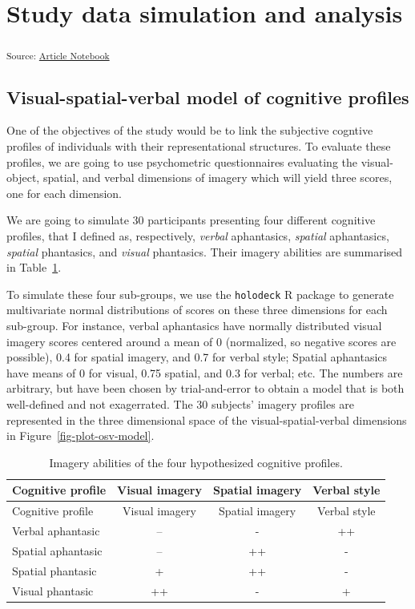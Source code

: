 \documentclass[
  authoryear]{elsarticle}
\begin{document}
\section{Study data simulation and
analysis}\label{study-data-simulation-and-analysis}

\textsubscript{Source:
\href{https://m-delem.github.io/2499-similarity-manuscript/index.qmd.html}{Article
Notebook}}

\subsection{Visual-spatial-verbal model of cognitive
profiles}\label{visual-spatial-verbal-model-of-cognitive-profiles}

One of the objectives of the study would be to link the subjective
cogntive profiles of individuals with their representational structures.
To evaluate these profiles, we are going to use psychometric
questionnaires evaluating the visual-object, spatial, and verbal
dimensions of imagery which will yield three scores, one for each
dimension.

We are going to simulate 30 participants presenting four different
cognitive profiles, that I defined as, respectively, \emph{verbal}
aphantasics, \emph{spatial} aphantasics, \emph{spatial} phantasics, and
\emph{visual} phantasics. Their imagery abilities are summarised in
Table~\ref{tbl-imageries}.

To simulate these four sub-groups, we use the \texttt{holodeck} R
package to generate multivariate normal distributions of scores on these
three dimensions for each sub-group. For instance, verbal aphantasics
have normally distributed visual imagery scores centered around a mean
of 0 (normalized, so negative scores are possible), 0.4 for spatial
imagery, and 0.7 for verbal style; Spatial aphantasics have means of 0
for visual, 0.75 spatial, and 0.3 for verbal; etc. The numbers are
arbitrary, but have been chosen by trial-and-error to obtain a model
that is both well-defined and not exagerrated. The 30 subjects' imagery
profiles are represented in the three dimensional space of the
visual-spatial-verbal dimensions in Figure~\ref{fig-plot-osv-model}.

\begin{longtable}[]{@{}lccc@{}}
\caption{Imagery abilities of the four hypothesized cognitive
profiles.}\label{tbl-imageries}\tabularnewline
\toprule\noalign{}
Cognitive profile & Visual imagery & Spatial imagery & Verbal style \\
\midrule\noalign{}
\endfirsthead
\toprule\noalign{}
Cognitive profile & Visual imagery & Spatial imagery & Verbal style \\
\midrule\noalign{}
\endhead
\bottomrule\noalign{}
\endlastfoot
Verbal aphantasic & -- & - & ++ \\
Spatial aphantasic & -- & ++ & - \\
Spatial phantasic & + & ++ & - \\
Visual phantasic & ++ & - & + \\
\end{longtable}
\end{document}
